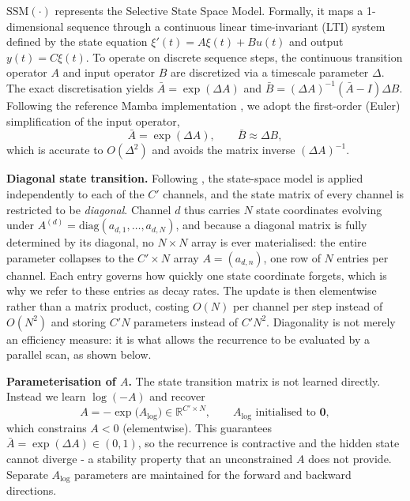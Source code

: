 \documentclass[11pt,a4paper]{article}
\newcommand{\R}{\mathbb{R}}
\begin{document}
\begin{enumerate}
		$\text{SSM}(\cdot)$ represents the Selective State Space Model. Formally, it maps a 1-dimensional sequence through a continuous linear time-invariant (LTI) system defined by the state equation $\xi'(t) = A \xi(t) + B u(t)$ and output $y(t) = C \xi(t)$. To operate on discrete sequence steps, the continuous transition operator $A$ and input operator $B$ are discretized via a timescale parameter $\Delta$. The exact discretisation yields $\bar{A} = \exp(\Delta A)$ and $\bar{B} = (\Delta A)^{-1}(\bar{A} - I)\Delta B$. Following the reference Mamba implementation \cite{gu2023mamba}, we adopt the first-order (Euler) simplification of the input operator,
		$$\bar{A} = \exp(\Delta A), \qquad \bar{B} \approx \Delta B,$$
		which is accurate to $O(\Delta^2)$ and avoids the matrix inverse $(\Delta A)^{-1}$.
		
		\textbf{Diagonal state transition.} Following \cite{gu2023mamba}, the state-space model is applied independently to each of the $C'$ channels, and the state matrix of every channel is restricted to be \emph{diagonal}. Channel $d$ thus carries $N$ state coordinates evolving under $A^{(d)} = \mathrm{diag}(a_{d,1},\dots,a_{d,N})$, and because a diagonal matrix is fully determined by its diagonal, no $N \times N$ array is ever materialised: the entire parameter collapses to the $C' \times N$ array $A = (a_{d,n})$, one row of $N$ entries per channel. Each entry governs how quickly one state coordinate forgets, which is why we refer to these entries as decay rates. The update is then elementwise rather than a matrix product, costing $O(N)$ per channel per step instead of $O(N^2)$ and storing $C'N$ parameters instead of $C'N^2$. Diagonality is not merely an efficiency measure: it is what allows the recurrence to be evaluated by a parallel scan, as shown below.

		\textbf{Parameterisation of $A$.} The state transition matrix is not learned directly. Instead we learn $\log(-A)$ and recover $$A = -\exp\bigl(A_{\log}\bigr) \in \R^{C' \times N}, \qquad A_{\log} \text{ initialised to } \mathbf{0},$$
		which constrains $A < 0$ (elementwise). This guarantees $\bar{A} = \exp(\Delta A) \in (0,1)$, so the recurrence is contractive and the hidden state cannot diverge - a stability property that an unconstrained $A$ does not provide. Separate $A_{\log}$ parameters are maintained for the forward and backward directions.


\end{enumerate}
\end{document}
